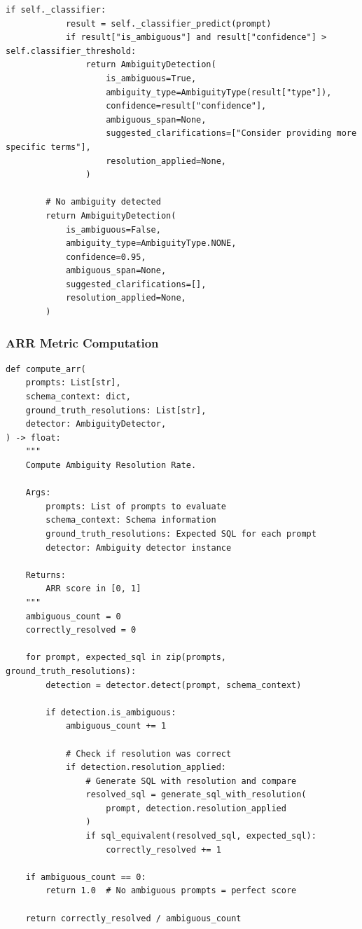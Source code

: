 \begin{lstlisting}[language=jsonx,caption={ARR module architecture}]
        if self._classifier:
            result = self._classifier_predict(prompt)
            if result["is_ambiguous"] and result["confidence"] > self.classifier_threshold:
                return AmbiguityDetection(
                    is_ambiguous=True,
                    ambiguity_type=AmbiguityType(result["type"]),
                    confidence=result["confidence"],
                    ambiguous_span=None,
                    suggested_clarifications=["Consider providing more specific terms"],
                    resolution_applied=None,
                )
        
        # No ambiguity detected
        return AmbiguityDetection(
            is_ambiguous=False,
            ambiguity_type=AmbiguityType.NONE,
            confidence=0.95,
            ambiguous_span=None,
            suggested_clarifications=[],
            resolution_applied=None,
        )
\end{lstlisting}

\subsubsection{ARR Metric Computation}

\begin{lstlisting}[language=jsonx,caption={ARR metric computation}]
def compute_arr(
    prompts: List[str],
    schema_context: dict,
    ground_truth_resolutions: List[str],
    detector: AmbiguityDetector,
) -> float:
    """
    Compute Ambiguity Resolution Rate.
    
    Args:
        prompts: List of prompts to evaluate
        schema_context: Schema information
        ground_truth_resolutions: Expected SQL for each prompt
        detector: Ambiguity detector instance
        
    Returns:
        ARR score in [0, 1]
    """
    ambiguous_count = 0
    correctly_resolved = 0
    
    for prompt, expected_sql in zip(prompts, ground_truth_resolutions):
        detection = detector.detect(prompt, schema_context)
        
        if detection.is_ambiguous:
            ambiguous_count += 1
            
            # Check if resolution was correct
            if detection.resolution_applied:
                # Generate SQL with resolution and compare
                resolved_sql = generate_sql_with_resolution(
                    prompt, detection.resolution_applied
                )
                if sql_equivalent(resolved_sql, expected_sql):
                    correctly_resolved += 1
    
    if ambiguous_count == 0:
        return 1.0  # No ambiguous prompts = perfect score
    
    return correctly_resolved / ambiguous_count
\end{lstlisting}

